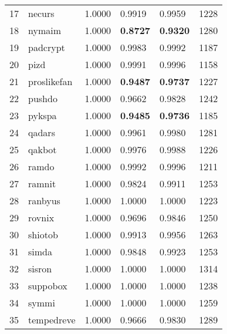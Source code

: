 \begin{table}[!htb]
{\begin{tabular}{l|l|llll}
            17 & necurs       & 1.0000    & 0.9919                     & 0.9959          & 1228    \\
            18 & nymaim       & 1.0000    & \textbf{0.8727}            & \textbf{0.9320} & 1280    \\
            19 & padcrypt     & 1.0000    & 0.9983                     & 0.9992          & 1187    \\
            20 & pizd         & 1.0000    & 0.9991                     & 0.9996          & 1158    \\
            21 & proslikefan  & 1.0000    & \textbf{0.9487}            & \textbf{0.9737} & 1227    \\
            22 & pushdo       & 1.0000    & 0.9662                     & 0.9828          & 1242    \\
            23 & pykspa       & 1.0000    & \textbf{0.9485}            & \textbf{0.9736} & 1185    \\
            24 & qadars       & 1.0000    & 0.9961                     & 0.9980          & 1281    \\
            25 & qakbot       & 1.0000    & 0.9976                     & 0.9988          & 1226    \\
            26 & ramdo        & 1.0000    & 0.9992                     & 0.9996          & 1211    \\
            27 & ramnit       & 1.0000    & 0.9824                     & 0.9911          & 1253    \\
            28 & ranbyus      & 1.0000    & 1.0000                     & 1.0000          & 1223    \\
            29 & rovnix       & 1.0000    & 0.9696                     & 0.9846          & 1250    \\
            30 & shiotob      & 1.0000    & 0.9913                     & 0.9956          & 1263    \\
            31 & simda        & 1.0000    & 0.9848                     & 0.9923          & 1253    \\
            32 & sisron       & 1.0000    & 1.0000                     & 1.0000          & 1314    \\
            33 & suppobox     & 1.0000    & 1.0000                     & 1.0000          & 1238    \\
            34 & symmi        & 1.0000    & 1.0000                     & 1.0000          & 1259    \\
            35 & tempedreve   & 1.0000    & 0.9666                     & 0.9830          & 1289    \\

\end{tabular}}
\end{table}
